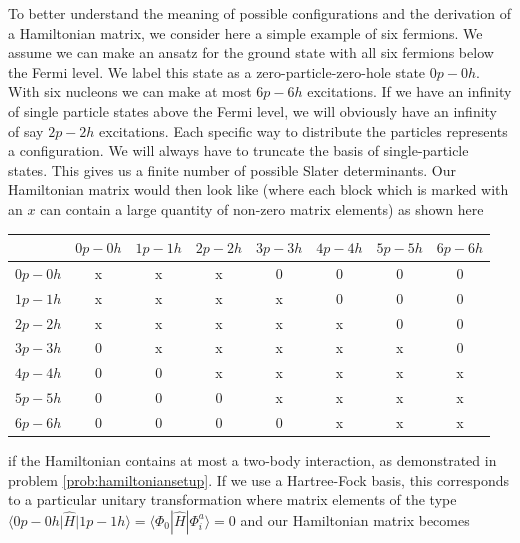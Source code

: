   To better understand the meaning of possible configurations and the
  derivation of a Hamiltonian matrix, we consider here a simple
  example of six fermions. We assume we can make an ansatz for the
  ground state with all six fermions below the Fermi level. We 
  label this state as a zero-particle-zero-hole state $0p-0h$. With
  six nucleons we can make at most $6p-6h$ excitations. If we have an
  infinity of single particle states above the Fermi level, we will
  obviously have an infinity of say $2p-2h$ excitations. Each specific way
  to distribute the particles represents a configuration. We will
  always have to truncate  the basis of single-particle states.
  This gives us a finite number of possible Slater determinants. Our
  Hamiltonian matrix would then look like (where each block which is
  marked with an $x$ can contain a large quantity of non-zero matrix
  elements) as shown here
  \begin{table}[h]
  \begin{center}
  \begin{tabular}{cccccccc}
  \hline \multicolumn{1}{c}{ } & \multicolumn{1}{c}{ $0p-0h$ } &
  \multicolumn{1}{c}{ $1p-1h$ } & \multicolumn{1}{c}{ $2p-2h$ } &
  \multicolumn{1}{c}{ $3p-3h$ } & \multicolumn{1}{c}{ $4p-4h$ } &
  \multicolumn{1}{c}{ $5p-5h$ } & \multicolumn{1}{c}{ $6p-6h$ }
  \\ \hline $0p-0h$ & x & x & x & 0 & 0 & 0 & 0 \\ $1p-1h$ & x & x & x
  & x & 0 & 0 & 0 \\ $2p-2h$ & x & x & x & x & x & 0 & 0 \\ $3p-3h$ &
  0 & x & x & x & x & x & 0 \\ $4p-4h$ & 0 & 0 & x & x & x & x & x
  \\ $5p-5h$ & 0 & 0 & 0 & x & x & x & x \\ $6p-6h$ & 0 & 0 & 0 & 0 &
  x & x & x \\ \hline
  \end{tabular}
  \end{center}
  \end{table}
  if the Hamiltonian contains at most a two-body interaction, as
  demonstrated in problem \ref{prob:hamiltoniansetup}.  If we use a
  Hartree-Fock basis, this corresponds to a particular unitary
  transformation where matrix elements of the type $\langle 0p-0h
  \vert \hat{H} \vert 1p-1h\rangle =\langle \Phi_0 |
  \hat{H}|\Phi_{i}^{a}\rangle=0$ and our Hamiltonian matrix becomes
